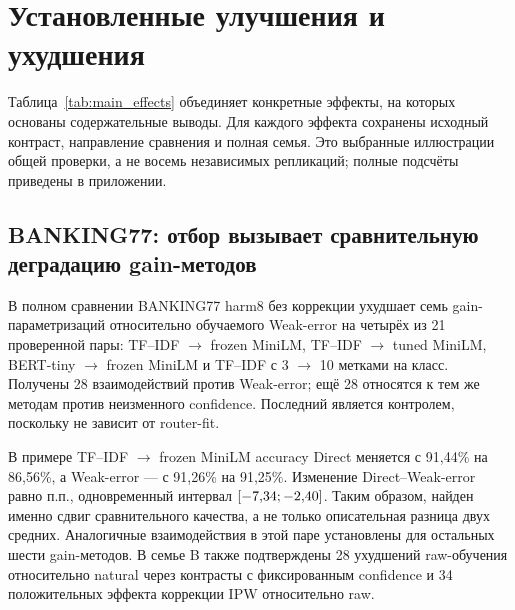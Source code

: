 \section{Установленные улучшения и ухудшения}
\label{sec:positive_evidence}
Таблица~\ref{tab:main_effects} объединяет конкретные эффекты,
на которых основаны содержательные выводы. Для каждого эффекта
сохранены исходный контраст, направление сравнения и полная семья.
Это выбранные иллюстрации общей проверки, а не восемь независимых
репликаций; полные подсчёты приведены в приложении.

\begin{table}[htbp]\centering\footnotesize
\caption{Основные подтверждённые эффекты при fit1000 и квоте 20\%.
Interaction означает изменение разности между natural и harm8 raw.
Пары: B --- TF--IDF $\to$ frozen MiniLM; C --- TFfull $\to$ MiniLM,
кроме Ternary--Direct (TF10 $\to$ TFfull); M --- TF3 $\to$ MiniLM.
В C используется accuracy-настройка, в B и M --- MSE.
Знак соответствует первому методу минус второй.}
\label{tab:main_effects}

\end{table}

\subsection{BANKING77: отбор вызывает сравнительную деградацию gain-методов}
В полном сравнении BANKING77 harm8 без коррекции ухудшает
семь gain-параметризаций относительно обучаемого Weak-error
на четырёх из 21 проверенной пары: TF--IDF $\to$ frozen MiniLM,
TF--IDF $\to$ tuned MiniLM, BERT-tiny $\to$ frozen MiniLM
и TF--IDF с 3 $\to$ 10 метками на класс.
Получены 28 взаимодействий против Weak-error; ещё 28 относятся
к тем же методам против неизменного confidence.
Последний является контролем, поскольку не зависит от router-fit.

В примере TF--IDF $\to$ frozen MiniLM accuracy Direct меняется
с 91,44\% на 86,56\%, а Weak-error --- с 91,26\% на 91,25\%.
Изменение Direct--Weak-error равно \BankShiftEffect{} п.п.,
одновременный интервал $[-7{,}34; -2{,}40]$.
Таким образом, найден именно сдвиг сравнительного качества,
а не только описательная разница двух средних.
Аналогичные взаимодействия в этой паре установлены для остальных
шести gain-методов. В семье B также подтверждены 28 ухудшений
raw-обучения относительно natural через контрасты с фиксированным
confidence и 34 положительных эффекта коррекции IPW относительно raw.

\begin{table}[htbp]\centering\small
\caption{BANKING77, TF--IDF $\to$ frozen MiniLM: средняя accuracy
в трёх составах, 20 обучений. IPW проверяется на тех же
harm8-извлечениях. Числа в таблице описательные; статистические
утверждения опираются на семью B.}
\label{tab:bank_extended}

\end{table}

